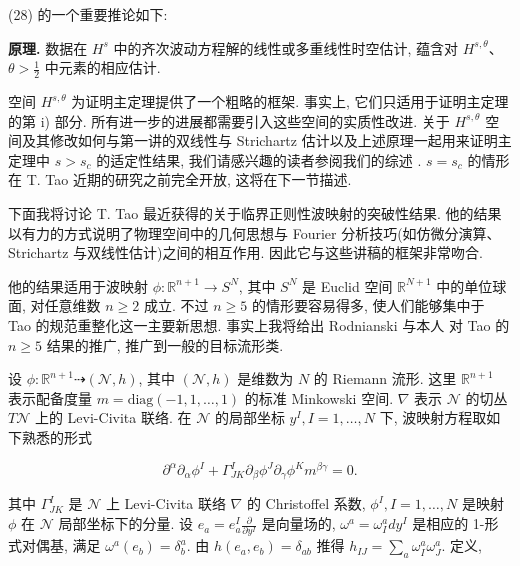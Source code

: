 (28) 的一个重要推论如下:

\textbf{原理.} 数据在 $H^{s}$ 中的齐次波动方程解的线性或多重线性时空估计, 蕴含对 $H^{s, \theta}$、$\theta > \frac{1}{2}$ 中元素的相应估计. 

空间 $H^{s, \theta}$ 为证明主定理提供了一个粗略的框架. 事实上, 它们只适用于证明主定理的第 i) 部分. 所有进一步的进展都需要引入这些空间的实质性改进. 关于 $H^{s, \theta}$ 空间及其修改如何与第一讲的双线性与 Strichartz 估计以及上述原理一起用来证明主定理中 $s > s_{c}$ 的适定性结果, 我们请感兴趣的读者参阅我们的综述 \cite{gfref45}. $s = s_{c}$ 的情形在 T. Tao 近期的研究之前完全开放, 这将在下一节描述. 


下面我将讨论 T. Tao 最近获得的关于临界正则性波映射的突破性结果. 他的结果以有力的方式说明了物理空间中的几何思想与 Fourier 分析技巧(如仿微分演算、Strichartz 与双线性估计)之间的相互作用. 因此它与这些讲稿的框架非常吻合. 

他的结果适用于波映射 $\phi : \mathbb{R}^{n+1} \to S^N$, 其中 $S^N$ 是 Euclid 空间 $\mathbb{R}^{N+1}$ 中的单位球面, 对任意维数 $n \geq 2$ 成立. 不过 $n \geq 5$ 的情形要容易得多, 使人们能够集中于 Tao 的规范重整化这一主要新思想. 事实上我将给出 Rodnianski 与本人 \cite{gfref41} 对 Tao 的 $n \geq 5$ 结果的推广, 推广到一般的目标流形类. 

设 $\phi : \mathbb{R}^{n+1} \dashrightarrow (\mathcal{N},  h)$, 其中 $(\mathcal{N},  h)$ 是维数为 $N$ 的 Riemann 流形. 这里 $\mathbb{R}^{n+1}$ 表示配备度量 $m = \mathrm{diag}(-1,  1,  \ldots,  1)$ 的标准 Minkowski 空间. $\nabla$ 表示 $\mathcal{N}$ 的切丛 $T\mathcal{N}$ 上的 Levi-Civita 联络. 在 $\mathcal{N}$ 的局部坐标 $y^I,  I = 1,  \ldots,  N$ 下, 波映射方程取如下熟悉的形式

\begin{equation}
\partial^ {\alpha} \partial_ {\alpha} \phi^ {I} + \Gamma_ {J K} ^ {I} \partial_ {\beta} \phi^ {J} \partial_ {\gamma} \phi^ {K} m ^ {\beta \gamma} = 0.\label{eq:cG-29}
\end{equation}

其中 $\Gamma_{JK}^{I}$ 是 $\mathcal{N}$ 上 Levi-Civita 联络 $\nabla$ 的 Christoffel 系数, $\phi^I,  I = 1,  \ldots,  N$ 是映射 $\phi$ 在 $\mathcal{N}$ 局部坐标下的分量. 设 $e_a = e_a^I \frac{\partial}{\partial y^I}$ 是向量场的, $\omega^a = \omega_I^a dy^I$ 是相应的 1-形式对偶基, 满足 $\omega^a(e_b) = \delta_b^a$. 由 $h(e_a,  e_b) = \delta_{ab}$ 推得 $h_{IJ} = \sum_a \omega_I^a \omega_J^a$. 定义, 

